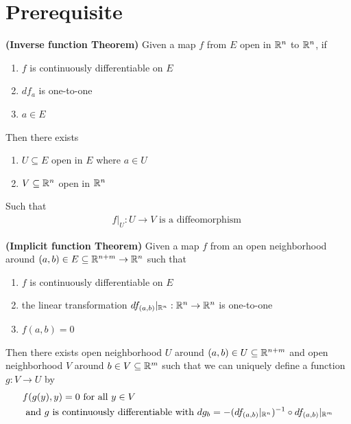 \documentclass{report}
\begin{document}
\section{Prerequisite}
\begin{theorem}
\textbf{(Inverse function Theorem)} Given a map $f$ from  $E$ open in $\mathbb{R}^n$ to $\mathbb{R}^n$, if 
\begin{enumerate}[label=(\alph*)]
  \item $f$ is continuously differentiable on $E$ 
  \item $df_a$ is one-to-one 
  \item $a\in E$
\end{enumerate}
Then there exists
\begin{enumerate}[label=(\alph*)]
  \item $U\subseteq E$ open in $E$ where $a\in U$
  \item $V\subseteq \mathbb{R}^n$ open in $\mathbb{R}^n$
\end{enumerate}
Such that 
\begin{align*}
f|_U:U\to V\text{ is a diffeomorphism }
\end{align*}
\end{theorem}
\begin{theorem}
\textbf{(Implicit function Theorem)} Given a map $f$ from an open neighborhood around $(a,b) \in E \subseteq \mathbb{R}^{n+m}\to \mathbb{R}^n$ such that 
\begin{enumerate}[label=(\alph*)]
  \item $f$ is continuously differentiable on $E$
  \item the linear transformation $df_{(a,b)}|_{\mathbb{R}^n}:\mathbb{R}^n \to \mathbb{R}^n$ is one-to-one
  \item $f(a,b)=0$
\end{enumerate}
Then there exists open neighborhood $U$ around $(a,b)\in U \subseteq \mathbb{R}^{n+m}$ and open neighborhood $V$ around  $b  \in V \subseteq \mathbb{R}^m$ such that we can uniquely define a function $g:V \to U$ by 
\begin{align*}
&f(g(y),y)=0\text{ for all $y \in V$}\\
&\text{ and }g\text{ is continuously differentiable with }dg_b=- (df_{(a,b)}|_{\mathbb{R}^n})^{-1}\circ df_{(a,b)}|_{\mathbb{R}^m}
\end{align*}
\end{theorem}
\end{document}
